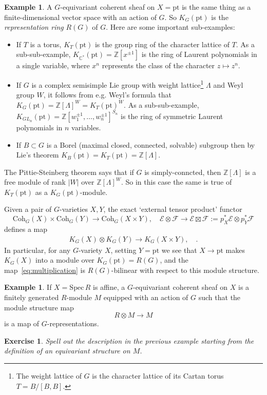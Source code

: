 \documentclass[11pt]{amsart}
\newtheorem{exercise}[dummy]{Exercise}
\theoremstyle{definition}
\newtheorem{example}[dummy]{Example}
\newcommand{\bZ}{\mathbb{Z}}
\newcommand{\Ec}{\mathcal{E}}
\newcommand{\Fc}{\mathcal{F}}
\newcommand{\Spec}{\mathrm{Spec}\,}
\newcommand{\Coh}{\mathrm{Coh}}
\numberwithin{equation}{subsection}
\numberwithin{figure}{subsection}
\newcommand{\pt}{\mathrm{pt}}
\begin{document}
\begin{example}
\label{eg:kpoint}
A $G$-equivariant coherent sheaf on $X=\pt$ is the same thing as a finite-dimensional vector space with an action of $G$. So $K_G(\pt)$ is the \emph{representation ring} $R(G)$ of $G$. Here are some important sub-examples: 
\begin{itemize}
\item If $T$ is a torus, $K_T(\pt)$ is the group ring of the character lattice of $T$. As a sub-sub-example, $K_{\mathbb{C}^*}(\pt)=\mathbb{Z}[x^{\pm1}]$ is the ring of Laurent polynomials in a single variable, where $x^n$ represents the class of the character $z\mapsto z^n$.

\item If $G$ is a complex semisimple Lie group with weight lattice\footnote{The weight lattice of $G$ is the character lattice of its Cartan torus $T=B/[B,B]$.} $\Lambda$  and Weyl group $W$, it follows from e.g. Weyl's formula that $K_G(\pt)=\mathbb{Z}[\Lambda]^W=K_T(\pt)^W$. As a sub-sub-example, $K_{GL_n}(\pt)=\bZ[w_1^{\pm1},\ldots,w_n^{\pm1}]^{S_n}$ is the ring of symmetric Laurent polynomials in $n$ variables.
\item If $B\subset G$ is a Borel (maximal closed, connected, solvable) subgroup then by Lie's theorem $K_B(\pt)=K_T(\pt)=\bZ[\Lambda]$.
\end{itemize}
 The Pittie-Steinberg theorem says that if $G$ is simply-conncted, then  $\bZ[\Lambda]$ is a free module of rank $|W|$ over $\bZ[\Lambda]^W$. So in this case the same is true of $K_T(\pt)$ as a $K_G(\pt)$-module.
\end{example}

Given a pair of $G$-varieties $X,Y$, the exact `external tensor product' functor 
$$
\Coh_G(X)\times \Coh_G(Y)\rightarrow \Coh_G(X\times Y),\quad \Ec\otimes\Fc \rightarrow \Ec\boxtimes\Fc:=p_X^*\Ec\otimes p_Y^*\Fc
$$ defines a map
\begin{align}
\label{eq:multiplication}
K_G(X)\otimes K_G(Y)\rightarrow K_G(X\times Y),\quad .
\end{align}
In particular, for any $G$-variety $X$, setting $Y=\pt$ we see that $X\rightarrow \pt$ makes $K_G(X)$ into a module over $K_G(\pt)= R(G)$,  and the map~\eqref{eq:multiplication} is $R(G)$-bilinear with respect to this module structure.

\begin{example}
If $X=\Spec R$ is affine, a $G$-equivariant coherent sheaf on $X$ is a finitely generated $R$-module $M$ equipped with an action of $G$ such that the module structure map
$$
R\otimes M \rightarrow M
$$
is a map of $G$-representations.
\end{example}
\begin{exercise}
Spell out the description in the previous example starting from the definition of an equivariant structure on $M$.
\end{exercise}
\end{document}
